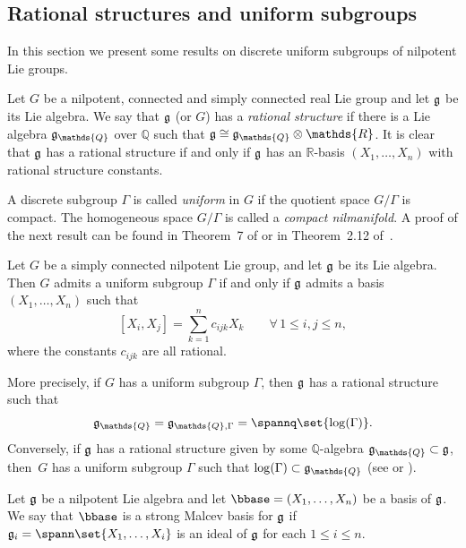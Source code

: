 \subsection{Rational structures and uniform subgroups}\label{section2.3}

 In this section we present some results on discrete uniform
subgroups of nilpotent Lie groups.


 Let $G$ be a nilpotent, connected
and simply connected real Lie group and let $\frak g$ be its Lie
algebra. We say that $\frak g$ (or $G$) has a \textit{rational
structure} if there is a Lie algebra $\frak g_\mathds{Q}$ over
$\mathds{Q}$ such that $\frak g \cong \frak g_\mathds{Q} \otimes
\mathds{R}$. It is clear that $\frak g$ has a rational structure if
and only if $\frak g$ has an $ \mathds{R}$-basis $(X_1,\dots,X_n)$
with rational structure constants.

 A discrete subgroup $\Gamma$ is
called \textit{uniform} in $G$ if the quotient space $G/\Gamma$ is
compact. The homogeneous space $G/\Gamma$ is called a
\textit{compact nilmanifold}. A proof of the next result can be
found in Theorem~7 of \cite{Malcev1} or in Theorem~2.12 of~\cite{Raghunathan}.


\begin{theorem} \label{Malcev-cri}
Let $G$ be a simply connected nilpotent Lie
group, and let $\frak g$ be its Lie algebra. Then $G$ admits a
uniform subgroup $\Gamma$ if and only if $\frak g$ admits a basis
$(X_1,\dotsc,X_n)$ such that
\[
[X_i, X_j] =  \sum_{k=1}^n c_{ijk} X_k\qquad \forall\,  1\leq i, j\leq n,
\]
 where the constants $c_{ijk}$ are all
rational.
\end{theorem}



More precisely, if $G$ has a uniform subgroup $\Gamma$, then $\frak
g$  has a rational structure such that
\[
\frak g_\mathds{Q}= \frak g_{\mathds{Q}, \Gamma}= \spannq\set{\log(\Gamma)}.
\]
 Conversely, if
$\frak g$ has a rational structure given by some
$\mathds{Q}$-algebra $\frak g_\mathds{Q}\subset \frak g$, then~$G$
has a uniform subgroup $\Gamma$ such that $\log(\Gamma) \subset
\frak g_\mathds{Q}$ (see \cite{Cor1} or \cite{Malcev1}).





\begin{definition} Let $\frak g$ be a nilpotent Lie algebra and let
$\bbase=(X_1, \ldots, X_n)$ be a basis of $\frak g$.
 We say that $\bbase$ is a  strong  Malcev
basis for $\frak g$ if  $\frak g_i=\spann\set{X_1, \ldots, X_i}$ is
 an ideal of $\frak g$ for each $1\leq i\leq n$.
\end{definition}


